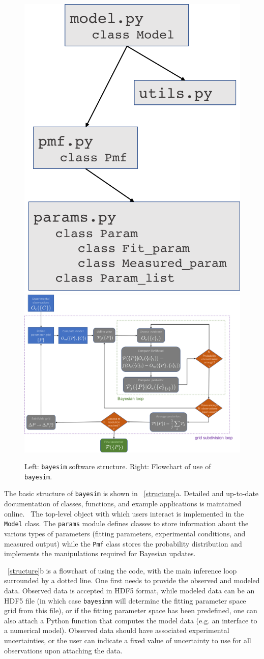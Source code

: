 \documentclass[aps,prl,amsmath,amssymb,superscriptaddress,notitlepage,groupedaddress]{revtex4-1}
\begin{document}
  \begin{figure}
    \includegraphics[width=0.25\columnwidth]{structure.png}
    \includegraphics[width=0.65\columnwidth]{flowchart.png}
    \caption{Left: \texttt{bayesim} software structure. Right: Flowchart of use of \texttt{bayesim}.}
    \label{structure}
  \end{figure}

  The basic structure of \texttt{bayesim} is shown in ~\autoref{structure}a. Detailed and up-to-date documentation of classes, functions, and example applications is maintained online.~\cite{docs} The top-level object with which users interact is implemented in the \texttt{Model} class. The \texttt{params} module defines classes to store information about the various types of parameters (fitting parameters, experimental conditions, and measured output) while the \texttt{Pmf} class stores the probability distribution and implements the manipulations required for Bayesian updates.

  ~\autoref{structure}b is a flowchart of using the code, with the main inference loop surrounded by a dotted line. One first needs to provide the observed and modeled data. Observed data is accepted in HDF5 format, while modeled data can be an HDF5 file (in which case \texttt{bayesimn} will determine the fitting parameter space grid from this file), or if the fitting parameter space has been predefined, one can also attach a Python function that computes the model data (e.g. an interface to a numerical model). Observed data should have associated experimental uncertainties, or the user can indicate a fixed value of uncertainty to use for all observations upon attaching the data.
\end{document}
